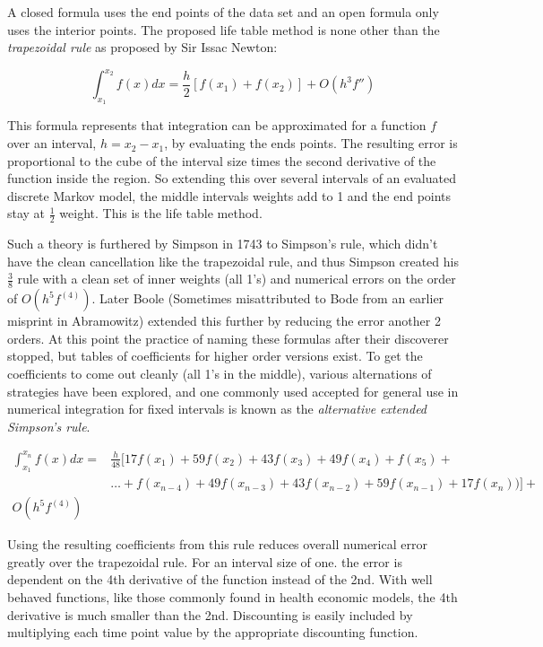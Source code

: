 \documentclass[]{article}
\begin{document}
A closed formula uses the end points of the data set and an open formula
only uses the interior points. The proposed life table method is none
other than the \emph{trapezoidal rule} as proposed by Sir Issac Newton:

\[ \int^{x_2}_{x_1} f(x) dx = \frac{h}{2}[ f(x_1) + f(x_2)] + O(h^3 f'') \]

This formula represents that integration can be approximated for a
function \(f\) over an interval, \(h=x_2 - x_1\), by evaluating the ends
points. The resulting error is proportional to the cube of the interval
size times the second derivative of the function inside the region. So
extending this over several intervals of an evaluated discrete Markov
model, the middle intervals weights add to 1 and the end points stay at
\(\frac{1}{2}\) weight. This is the life table method.

Such a theory is furthered by Simpson in 1743 to Simpson's rule, which
didn't have the clean cancellation like the trapezoidal rule, and
thus Simpson created his \(\frac{3}{8}\) rule with a clean set of
inner weights (all 1's) and numerical errors on the order of \(O(h^5 f^{(4)})\)\cite{simpson1743}.
Later Boole (Sometimes misattributed to Bode from an earlier
  misprint in Abramowitz\cite{abramowitz1965}) extended this further by
reducing the error another 2 orders\cite{boole1860}. At this point the
practice of naming these formulas after their discoverer stopped, but
tables of coefficients for higher order versions exist\cite{abramowitz1965}.
To get the coefficients to come out cleanly (all 1's in the middle), various alternations
of strategies have been explored, and one commonly used accepted for
general use in numerical integration for fixed intervals is known as the
\emph{alternative extended Simpson's rule}\cite{epperson2007, hamming1973, press1992}.

\[
\begin{split}
\int^{x_n}_{x_1} f(x) dx = & \frac{h}{48} [ 17 f(x_1) + 59 f(x_2) + 43 f(x_3) + 49 f(x_4) + f(x_5) + \\ 
  & \dots + f(x_{n-4}) + 49 f(x_{n-3}) + 43 f(x_{n-2}) + 59 f(x_{n-1}) + 17 f(x_n) ) ] + \\
  O\left(h^5 f^{(4)} \right)
\end{split}
\]

Using the resulting coefficients from this rule reduces overall
numerical error greatly over the trapezoidal rule. For an interval size
of one. the error is dependent on the 4th derivative of the function
instead of the 2nd. With well behaved functions, like those commonly
found in health economic models, the 4th derivative is much smaller than
the 2nd. Discounting is easily included by multiplying each time point
value by the appropriate discounting function.
\end{document}
